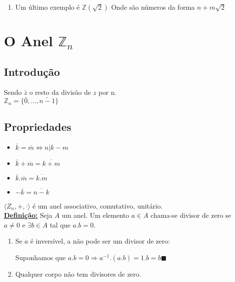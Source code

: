 \documentclass[12pt]{book}
\newcommand{\mytitle}[1]{\textbf{\underline{#1}}}
\newcommand{\ring}[1]{\langle #1 \rangle}
\begin{document}
\begin{enumerate}
\item Um último exemplo é $\mathbb{Z}(\sqrt 2)$
  Onde são números da forma $n + m\sqrt 2$
\end{enumerate}
\chapter{O Anel $\mathbb{Z}_n$}
\section{Introdução}

Sendo $\bar{z}$ o resto da divisão de $z$ por n.\\
$\mathbb{Z}_n=\{\bar{0},\dots,\bar{n-1}\}$\\

\section{Propriedades}
\begin{itemize}
\item $\overline{k}=\overline{m} \Leftrightarrow n|k-m$
\item $\overline{k}+\overline{m}=\overline{k+m}$
\item $\overline{k}.\overline{m}=\overline{k.m}$
\item $-\overline{k}=\overline{n-k}$
\end{itemize}
$\ring{Z_n, +, \cdot}$ é um anel associativo, comutativo, unitário.\\
\mytitle{Definição:} Seja $A$ um anel. Um elemento $a\in A$ chama-se divisor de zero se $a\neq 0$ e $\exists b \in A$ tal que $a.b=0$.
\begin{enumerate}
\item Se $a$ é inversível, a não pode ser um divisor de zero:

  Suponhamos que $a.b=0 \Rightarrow a^{-1}.(a.b)=1.b=b\blacksquare$
\item Qualquer corpo não tem divisores de zero.
\end{enumerate}
\end{document}
